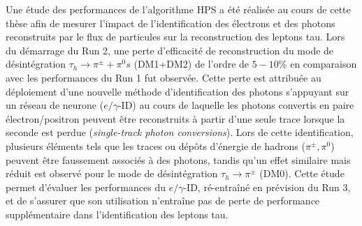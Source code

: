 Une étude des performances de l'algorithme HPS a été réalisée au cours de cette thèse afin de mesurer l'impact de l'identification des électrons et des photons reconstruits par le flux de particules sur la reconstruction des leptons tau. Lors du démarrage du Run 2, une perte d'efficacité de reconstruction du mode de désintégration $\tau_h\rightarrow\pi^{\pm}+\pi^0s$ (DM1+DM2) de l'ordre de $5-10\%$ en comparaison avec les performances du Run 1 fut observée. Cette perte est attribuée au déploiement d'une nouvelle méthode d'identification des photons s'appuyant sur un réseau de neurone ($e/\gamma$-ID) au cours de laquelle les photons convertis en paire électron/positron peuvent être reconstruits à partir d'une seule trace lorsque la seconde est perdue (\textit{single-track photon conversions}). Lors de cette identification, plusieurs éléments tels que les traces ou dépôts d'énergie de hadrons ($\pi^{\pm},\pi^0$) peuvent être faussement associés à des photons, tandis qu'un effet similaire mais réduit est observé pour le mode de désintégration $\tau_h\rightarrow\pi^{\pm}$ (DM0). Cette étude permet d'évaluer les performances du $e/\gamma$-ID, ré-entraîné en prévision du Run 3, et de s'assurer que son utilisation n'entraîne pas de perte de performance supplémentaire dans l'identification des leptons tau. \\

